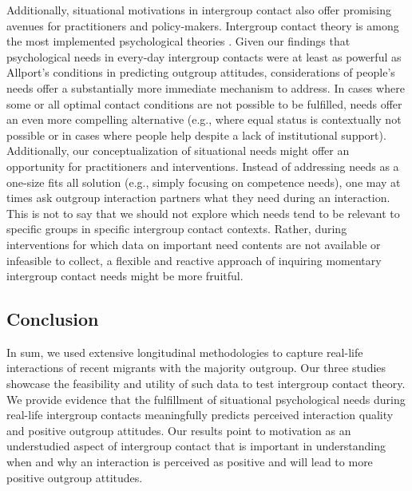 \documentclass[man, 12pt, a4paper, mask]{apa7}
\theoremstyle{break}
\theoremstyle{plain}
\begin{document}
Additionally, situational motivations in intergroup contact also offer promising avenues for practitioners and policy-makers. Intergroup contact theory is among the most implemented psychological theories \citep[e.g.,][]{Pettigrew2006, AlRamiah2012a, Reimer2021}. Given our findings that psychological needs in every-day intergroup contacts were at least as powerful as Allport's conditions in predicting outgroup attitudes, considerations of people's needs offer a substantially more immediate mechanism to address. In cases where some or all optimal contact conditions are not possible to be fulfilled, needs offer an even more compelling alternative (e.g., where equal status is contextually not possible or in cases where people help despite a lack of institutional support). Additionally, our conceptualization of situational needs might offer an opportunity for practitioners and interventions. Instead of addressing needs as a one-size fits all solution (e.g., simply focusing on competence needs), one may at times ask outgroup interaction partners what they need during an interaction. This is not to say that we should not explore which needs tend to be relevant to specific groups in specific intergroup contact contexts. Rather, during interventions for which data on important need contents are not available or infeasible to collect, a flexible and reactive approach of inquiring momentary intergroup contact needs might be more fruitful.


\subsection{Conclusion}
In sum, we used extensive longitudinal methodologies to capture real-life interactions of recent migrants with the majority outgroup. Our three studies showcase the feasibility and utility of such data to test intergroup contact theory. We provide evidence that the fulfillment of situational psychological needs during real-life intergroup contacts meaningfully predicts perceived interaction quality and positive outgroup attitudes. Our results point to motivation as an understudied aspect of intergroup contact that is important in understanding when and why an interaction is perceived as positive and will lead to more positive outgroup attitudes.








\end{document}
